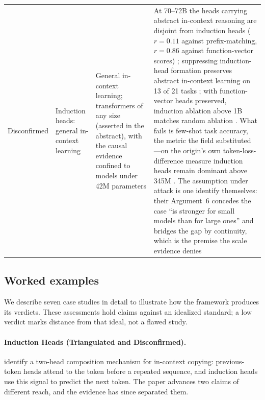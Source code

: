 \documentclass{article}
\begin{document}
{\begin{longtable}{@{}>{\raggedright\arraybackslash}p{2.2cm}>{\raggedright\arraybackslash}p{2.2cm}>{\raggedright\arraybackslash}p{3.4cm}>{\raggedright\arraybackslash}p{7.4cm}@{}}
\midrule
Disconfirmed & Induction heads: general in-context learning \citep{olsson2022context} & General in-context learning; transformers of any size (asserted in the abstract), with the causal evidence confined to models under 42M parameters & At 70--72B the heads carrying abstract in-context reasoning are disjoint from induction heads ($r=0.11$ against prefix-matching, $r=0.86$ against function-vector scores) \citep{webb2025emergent}; suppressing induction-head formation preserves abstract in-context learning on 13 of 21 tasks \citep{sahin2025incontext}; with function-vector heads preserved, induction ablation above 1B matches random ablation \citep{yin2025which}. What fails is few-shot task accuracy, the metric the field substituted---on the origin's own token-loss-difference measure induction heads remain dominant above 345M \citep{yin2025which}. The assumption under attack is one \citet{olsson2022context} identify themselves: their Argument~6 concedes the case ``is stronger for small models than for large ones'' and bridges the gap by continuity, which is the premise the scale evidence denies \\
\end{longtable}
}


\subsection{Worked examples}

We describe seven case studies in detail to illustrate how the framework produces its verdicts. These assessments hold claims against an idealized standard; a low verdict marks distance from that ideal, not a flawed study.

\paragraph{Induction Heads (Triangulated and Disconfirmed).} \citet{olsson2022context} identify a two-head composition mechanism for in-context copying: previous-token heads attend to the token before a repeated sequence, and induction heads use this signal to predict the next token. The paper advances two claims of different reach, and the evidence has since separated them.
\end{document}
